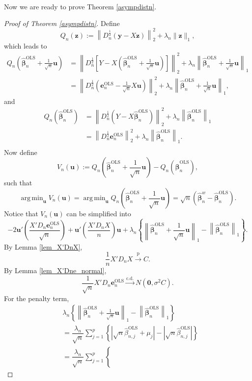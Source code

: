 \documentclass[12pt]{article}
\DeclareMathOperator*{\argmin}{arg\,min} %
\newcommand{\bnw}{\widehat{\bm{\beta}}_n^w} %
\newcommand{\bLS}{\widehat{\bm{\beta}}_n^{\text{OLS}}} %
\newcommand{\eLS}{\bm{e}_n^{\text{OLS}}} %
\newcommand{\dn}{\frac{1}{n}} %
\newcommand{\dqn}{\frac{1}{\sqrt{n}}} %
\newcommand{\CONV}[1]{\stackrel{\text{#1}}{\longrightarrow}} %
\newcommand{\bu}{\bm{u}} %
\begin{document}
Now we are ready to prove Theorem \ref{asympdistn}. 

\begin{proof} [Proof of Theorem \ref{asympdistn}]
	Define 
	$$
	Q_n (\bm{z}) := \left\| 
						 	D_n^{\frac{1}{2}} (\bm{y} - X \bm{z})
				    \right\|_2^2 
				    + \lambda_n \| \bm{z} \|_1,
	$$
	which leads to 
	\begin{align*}
	Q_n \left( \bLS + \dqn \bu \right)
	&= \left\| 
			  D_n^{\frac{1}{2}} 
			  \left[
			  		Y - X \left( \bLS + \dqn \bu \right)				
			  \right]	
	   \right\|_2^2
	   + \lambda_n \left\|
	   					 \bLS + \dqn \bu
	   			   \right\|_1 \\
	&= \left\| 
			 D_n^{\frac{1}{2}} 
			\left( 
				 \eLS - \dqn X \bu 
			\right)				
		\right\|_2^2
		+ \lambda_n \left\|
						\bLS + \dqn \bu
					\right\|_1, 
	\end{align*}
	and 
	\begin{align*}
	Q_n \left( \bLS  \right)
	&= \left\| 
			 D_n^{\frac{1}{2}} 
			 \left( 
				  Y - X \bLS 
			 \right)				
		\right\|_2^2
		+ \lambda_n \left\| \bLS \right\|_1 \\
	&= \left\| 
			 D_n^{\frac{1}{2}} \eLS		
	   \right\|_2^2
	   + \lambda_n \left\| \bLS \right\|_1 .\\
	\end{align*}
	Now define
	$$
	V_n(\bu) := Q_n \left( \bLS  + \dqn \bu \right) - Q_n \left( \bLS  \right), 
	$$
	such that 
	$$
	\argmin_{\bu} V_n(\bu)
	= \argmin_{\bu}  Q_n \left( \bLS  + \dqn \bu \right)
	= \sqrt{n} \left( \bnw - \bLS \right).
	$$
	Notice that $V_n(\bu)$ can be simplified into 
	$$
	-2 \bu' \left( \dfrac{X' D_n \eLS}{\sqrt{n}} \right)
	+ \bu' \left( \dfrac{X' D_n X}{n} \right) \bu
	+ \lambda_n \left\{
					\left\| \bLS + \dqn \bu \right\|_1
					- \left\| \bLS \right\|_1 
				\right\}.
	$$
	By Lemma \ref{lem_X'DnX}, 
	$$
	\dn X' D_n X \CONV{p} C.
	$$
	By Lemma \ref{lem_X'Dne_normal}, 
	$$
	\dqn X' D_n \eLS 
	\CONV{c.d.}
	N \left( \bm{0}, \sigma^2 C \right).
	$$
	For the penalty term,
	\begin{align*}
	&\lambda_n \left\{
					\left\| \bLS + \dqn \bu \right\|_1
					- \left\| \bLS \right\|_1 
			   \right\} \\
	&= \dfrac{\lambda_n}{\sqrt{n}} 
		\sum_{j=1}^p
		\left\{
				\left| 
						\sqrt{n} \widehat{\beta}_{n,j}^{\text{OLS}} 
						+ \mu_j
				\right|
			  - \left|
			  			\sqrt{n} \widehat{\beta}_{n,j}^{\text{OLS}}
			   	\right|
		\right\} \\
	&= \dfrac{\lambda_n}{\sqrt{n}} \sum_{j=1}^p
		\left\{

\end{align*}
\end{proof}
\end{document}
